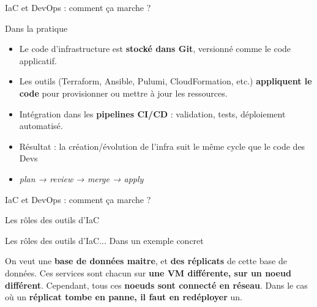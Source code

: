 \documentclass[aspectratio=169,10pt]{beamer}
\begin{document}

\begin{frame}{IaC et DevOps : comment ça marche ?}

  \begin{alertblock}{Dans la pratique}
    \begin{itemize}
      \item Le code d’infrastructure est \textbf{stocké dans Git}, versionné comme le code applicatif.
      \item Les outils (Terraform, Ansible, Pulumi, CloudFormation, etc.) 
            \textbf{appliquent le code} pour provisionner ou mettre à jour les ressources.
      \item Intégration dans les \textbf{pipelines CI/CD} : validation, tests, déploiement automatisé.
      \item Résultat : la création/évolution de l’infra suit le même cycle que le code des Devs 
     \item[] \textit{plan → review → merge → apply}
    \end{itemize}
  \end{alertblock}

\end{frame}


\begin{frame}{IaC et DevOps : comment ça marche ?}

  

\end{frame}


\begin{frame}{Les rôles des outils d'IaC}

\hspace*{-0.7cm}


\end{frame}

\begin{frame}{Les rôles des outils d'IaC... Dans un exemple concret}

On veut une \textbf{base de données maitre}, et \textbf{des réplicats} de cette base de données. Ces services sont chacun sur \textbf{une VM différente, sur un noeud différent}. Cependant, tous ces \textbf{noeuds sont connecté en réseau}. Dans le cas où un \textbf{réplicat tombe en panne, il faut en redéployer} un.

\vspace*{0.7cm}

\hspace*{-0.7cm}


\end{frame}
\end{document}
